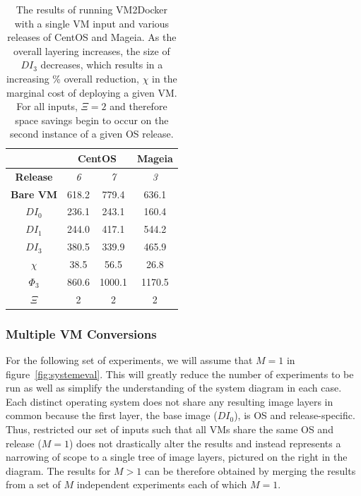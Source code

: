 \begin{table}[h]
\centering
    \begin{tabular}{| c | c | c | c |}
    \hline
& \multicolumn{2}{|c|}{\bfseries CentOS} & \multicolumn{1}{|c|}{\bfseries Mageia} \\ \hline
    \bfseries Release & \itshape 6 & \itshape 7 & \itshape 3 \\ \hline
    \bfseries Bare VM & 618.2 & 779.4 & 636.1\\ \hline
    \bfseries $DI_0$ & 236.1 & 243.1 & 160.4  \\ \hline
    \bfseries $DI_1$ & 244.0 & 417.1 & 544.2 \\ \hline
    \bfseries $DI_3$ & 380.5 & 339.9 & 465.9 \\ \hline
\bfseries $\chi$ & 38.5 & 56.5 & 26.8 \\ \hline
     \bfseries $\Phi_3$ & 860.6 & 1000.1 & 1170.5 \\ \hline
     \bfseries $\Xi$ & 2 & 2 & 2 \\ \hline
    \end{tabular}
\caption{The results of running VM2Docker with a single VM input and various releases of CentOS and Mageia. As the overall layering increases, the size of $DI_3$ decreases, which results in a increasing \% overall reduction, $\chi$ in the marginal cost of deploying a given VM. For all inputs, $\Xi = 2$ and therefore space savings begin to occur on the second instance of a given OS release.}
\label{table:diffpm2}
\end{table}




\subsubsection{Multiple VM Conversions}
\label{sec:multivm}
For the following set of experiments, we will assume that $M=1$ in figure~\ref{fig:systemeval}. This will greatly reduce the number of experiments to be run as well as simplify the understanding of the system diagram in each case. Each distinct operating system does not share any resulting image layers in common because the first layer, the base image ($DI_0$), is OS and release-specific. Thus, restricted our set of inputs such that all VMs share the same OS and release ($M=1$) does not drastically alter the results and instead represents a narrowing of scope to a single tree of image layers, pictured on the right in the diagram. The results for $M>1$ can be therefore obtained by merging the results from a set of $M$ independent experiments each of which $M=1$.

